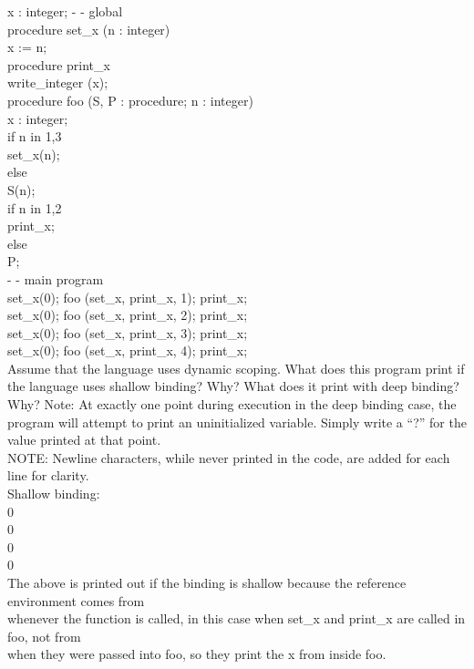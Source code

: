\documentclass[12pt]{article}
\begin{document}
\begin{flushleft}
\qquad x : integer; \qquad - - global\\
\qquad procedure set\_x (n : integer)\\
\qquad x := n;\\
\qquad procedure print\_x\\
\qquad \qquad write\_integer (x);\\
\qquad procedure foo (S, P : procedure; n : integer)\\
\qquad \qquad x : integer;\\
\qquad \qquad if n in {1,3}\\
\qquad \qquad \qquad set\_x(n);\\
\qquad \qquad else\\
\qquad \qquad \qquad S(n);\\
\qquad \qquad if n in {1,2}\\
\qquad \qquad \qquad print\_x;\\
\qquad \qquad else\\
\qquad \qquad \qquad P;\\
\qquad - - main program\\
\qquad set\_x(0); foo (set\_x, print\_x, 1); print\_x;\\
\qquad set\_x(0); foo (set\_x, print\_x, 2); print\_x;\\
\qquad set\_x(0); foo (set\_x, print\_x, 3); print\_x;\\
\qquad set\_x(0); foo (set\_x, print\_x, 4); print\_x;\\
[2mm]

Assume that the language uses dynamic scoping. What does this program print if the
language uses shallow binding? Why? What does it print with deep binding? Why?
Note: At exactly one point during execution in the deep binding case, the program will
attempt to print an uninitialized variable. Simply write a “?” for the value printed at that
point.\\
[2mm]

\qquad NOTE: Newline characters, while never printed in the code, are added for each line for clarity.\\
[2mm]

\qquad Shallow binding:\\
[2mm]

\qquad {} 0\\
\qquad {} 0\\
\qquad {} 0\\
\qquad {} 0\\

\qquad The above is printed out if the binding is shallow because the reference environment comes from\\
\qquad whenever the function is called, in this case when set\_x and print\_x are called in foo, not from\\
\qquad when they were passed into foo, so they print the x from inside foo.\\
[2mm]


\end{flushleft}
\end{document}
